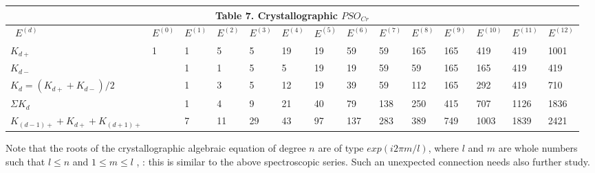 \documentclass[a4paper,9pt]{article}
\begin{document}
\begin{table}
\label{tab:7:table7}
  \hskip-1.0cm\begin{tabular}{llllllllllllll}
    \toprule
    \multicolumn{14}{c}{Table 7. Crystallographic $PSO_{Cr}$}                  \\
    \cmidrule(r){1-14}
    \midrule
    
     
     
      
      \ $E^{(d)}$ & $E^{(0)}$ & $E^{(1)} $ & $E^{(2)}$ & $E^{(3)} $& $E^{(4)}$ &$ E^{(5)}$ &$ E^{(6)} $&$ E^{(7)}$ &$ E^{(8)}$ & $E^{(9)}$ &$ E^{(10)} $&$ E^{(11)} $&$ E^{(12)}$ \\
    \midrule
    $K_{d+}$  & 1 & 1 & 5 & 5 & 19 & 19 & 59 & 59 & 165 & 165 & 419 & 419 & 1001 \\
    
     $K_{d-}$  &  & 1 & 1 & 5 & 5 & 19 & 19 & 59 & 59 & 165 & 165& 419 & 419 \\
     
      $K_{d} = (K_{d+} + K_{d-})/2$  & & 1 & 3 & 5 & 12 & 19 & 39 & 59 & 112 & 165 & 292 & 419 & 710 \\
      
      $\Sigma K_{d}$ &  & 1 & 4 & 9 & 21 & 40 & 79 & 138 & 250 & 415 & 707 & 1126 & 1836 \\
      
      $K_{(d-1)+} +K_{d+}+ K_{(d+1)+}$  &  & 7 & 11 & 29 & 43 & 97 & 137 & 283 & 389 & 749 & 1003 & 1839 & 2421 \\

      

    \bottomrule
  \end{tabular}
\end{table}
    
    Note that the roots of the crystallographic algebraic equation of degree $n$ are of type $exp(i2\pi m/l)$, where $l$ and $m$ are whole numbers such that $ l \leq n $ and $ 1 \leq m \leq l $ ,  : this is similar to the above spectroscopic series. Such an unexpected connection needs also further study.   
\end{document}

